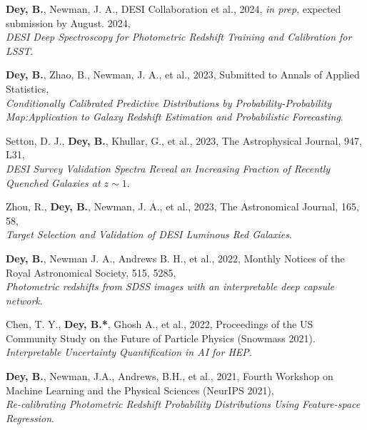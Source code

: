   \item \textbf{Dey, B.}, Newman, J. A., DESI Collaboration et al., 2024, \textit{in prep}, expected submission by August. 2024,\\
    \textrm{\textit{DESI Deep Spectroscopy for Photometric Redshift Training and Calibration for LSST}}. %
    
    
    \item  \textbf{Dey, B.}, Zhao, B., Newman, J. A., et al., 2023, Submitted to Annals of Applied Statistics,\\ \textit{Conditionally Calibrated Predictive Distributions by Probability-Probability Map:Application to Galaxy Redshift Estimation and Probabilistic Forecasting}. 
    
    \item Setton, D. J., \textbf{Dey, B.}, Khullar, G., et al., 2023, The Astrophysical Journal, 947, L31, \\ \textit{DESI Survey Validation Spectra Reveal an Increasing Fraction of Recently Quenched Galaxies at $z\sim1$}.
    
    \item Zhou, R., \textbf{Dey, B.}, Newman, J. A., et al., 2023, The Astronomical Journal, 165, 58, \\ \textit{Target Selection and Validation of DESI Luminous Red Galaxies}.
    
    \item  \textbf{Dey, B.}, Newman J. A., Andrews B. H., et al., 2022, Monthly Notices of the Royal Astronomical Society, 515, 5285, \\ \textit{Photometric redshifts from SDSS images with an interpretable deep capsule network}. 

    \item Chen, T. Y., \textbf{Dey, B.*}, Ghosh A., et al., 2022, Proceedings of the US Community Study on the Future of Particle Physics (Snowmass 2021). \\ \textit{Interpretable Uncertainty Quantification in AI for HEP.}
    
    
   
    \item \textbf{Dey, B.}, Newman, J.A., Andrews, B.H., et al., 2021, Fourth Workshop on Machine Learning and the Physical Sciences (NeurIPS 2021),\\ \textit{Re-calibrating Photometric Redshift Probability Distributions Using Feature-space Regression}. 
    
